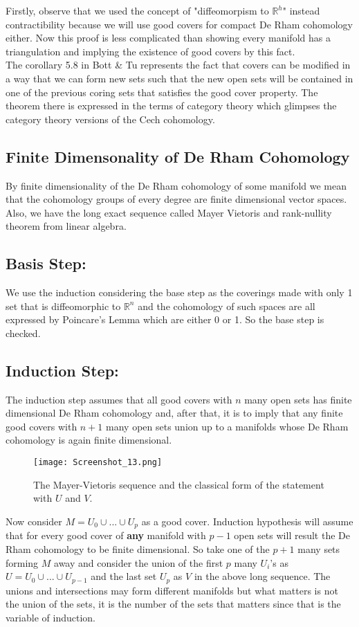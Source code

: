 \documentclass[12pt]{amsart}
\theoremstyle{remark}
\begin{document}
\indent Firstly, observe that we used the concept of "diffeomorpism to $\mathbb{R}^h$" instead contractibility because we will use good covers for compact De Rham cohomology either. Now this proof is less complicated than showing every manifold has a triangulation and implying the existence of good covers by this fact. \\
\indent The corollary 5.8 in Bott \& Tu represents the fact that covers can be modified in a way that we can form new sets such that the new open sets will be contained in one of the previous coring sets that satisfies the good cover property. The theorem there is expressed in the terms of category theory which glimpses the category theory versions of the Cech cohomology. \\

\subsection{Finite Dimensonality of De Rham Cohomology} \indent By finite dimensionality of the De Rham cohomology of some manifold we mean that the cohomology groups of every degree are finite dimensional vector spaces. Also, we have the long exact sequence called Mayer Vietoris and rank-nullity theorem from linear algebra.

\subsection*{Basis Step:} \indent We use the induction considering the base step as the coverings made with only 1 set that is diffeomorphic to $\mathbb{R}^n$ and the cohomology of such spaces are all expressed by Poincare's Lemma which are either 0 or 1. So the base step is checked.

\subsection*{Induction Step:} \indent The induction step assumes that all good covers with $n$ many open sets has finite dimensional De Rham cohomology and, after that, it is to imply that any  finite good covers with $n+1$ many open sets union up to a manifolds whose De Rham cohomology is again finite dimensional.

\begin{figure}[h]
    \centering
    \texttt{[image: Screenshot\_13.png]}
    \caption{The Mayer-Vietoris sequence and the classical form of the statement with $U$ and $V$.}
    \label{fig:circles_intertg}
\end{figure} 
\indent \indent Now consider $M = U_0\cup ... \cup U_p $ as a good cover. Induction hypothesis will assume that for every good cover of \textbf{any} manifold with $p-1$ open sets will result the De Rham cohomology to be finite dimensional. So take one of the $p+1$ many sets forming $M$ away and consider the union of the first $p$ many $U_i$'s as $U = U_0 \cup ... \cup U_{p-1}$ and the last set $U_{p}$ as $V$ in the above long sequence. The unions and intersections may form different manifolds but what matters is not the union of the sets, it is the number of the sets that matters since that is the variable of induction.
\end{document}
